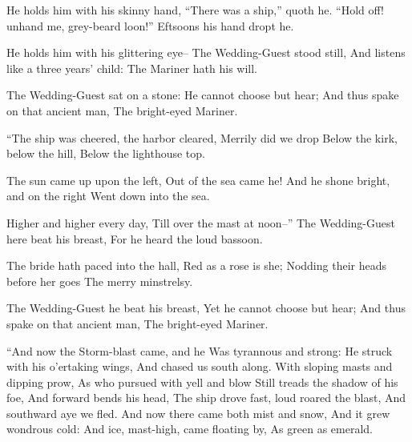 \documentclass{book}
\newcommand{\strophaVI}{%
  \Forma \strophae {0{\penalty 10000}0000{\penalty 10000}0}}
\begin{document}
  He holds him with his skinny hand,
  ``There was a ship,'' quoth he.                                       
  ``Hold off! unhand me, grey-beard loon!''
  Eftsoons his hand dropt he.

%
  He holds him with his glittering eye--
  The Wedding-Guest stood still,
  And listens like a three years' child:                              
  The Mariner hath his will.

%
  The Wedding-Guest sat on a stone:
  He cannot choose but hear;
  And thus spake on that ancient man,
  The bright-eyed Mariner.                                            

  ``The ship was cheered, the harbor cleared,
  Merrily did we drop
  Below the kirk, below the hill,
  Below the lighthouse top.

%
  The sun came up upon the left,                                      
  Out of the sea came he!
  And he shone bright, and on the right
  Went down into the sea.

  Higher and higher every day,
  Till over the mast at noon--''                                       
%
  The Wedding-Guest here beat his breast,
  For he heard the loud bassoon.

  The bride hath paced into the hall,
  Red as a rose is she;
  Nodding their heads before her goes                                 
  The merry minstrelsy.

  The Wedding-Guest he beat his breast,
  Yet he cannot choose but hear;
  And thus spake on that ancient man,
  The bright-eyed Mariner.                                            


%
  ``And now the Storm-blast came, and he
  Was tyrannous and strong:
  He struck with his o'ertaking wings,
  And chased us south along.
{\strophaVI
  With sloping masts and dipping prow,                                
  As who pursued with yell and blow
  Still treads the shadow of his foe,
  And forward bends his head,
  The ship drove fast, loud roared the blast,
  And southward aye we fled.                                          
}
  And now there came both mist and snow,
  And it grew wondrous cold:
%
  And ice, mast-high, came floating by,
  As green as emerald.
\end{document}
